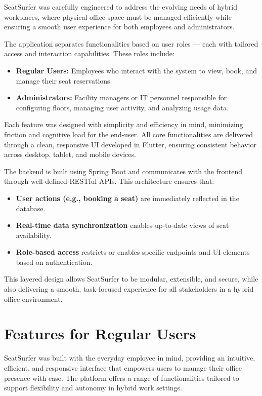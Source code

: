 \documentclass[12pt,a4paper]{report} %
\begin{document}
SeatSurfer was carefully engineered to address the evolving needs of hybrid workplaces, where physical office space must be managed efficiently while ensuring a smooth user experience for both employees and administrators.

The application separates functionalities based on user roles — each with tailored access and interaction capabilities. These roles include:

\begin{itemize}
    \item \textbf{Regular Users:} Employees who interact with the system to view, book, and manage their seat reservations.
    \item \textbf{Administrators:} Facility managers or IT personnel responsible for configuring floors, managing user activity, and analyzing usage data.
\end{itemize}

Each feature was designed with simplicity and efficiency in mind, minimizing friction and cognitive load for the end-user. All core functionalities are delivered through a clean, responsive UI developed in Flutter, ensuring consistent behavior across desktop, tablet, and mobile devices.

The backend is built using Spring Boot and communicates with the frontend through well-defined RESTful APIs. This architecture ensures that:

\begin{itemize}
    \item \textbf{User actions (e.g., booking a seat)} are immediately reflected in the database.
    \item \textbf{Real-time data synchronization} enables up-to-date views of seat availability.
    \item \textbf{Role-based access} restricts or enables specific endpoints and UI elements based on authentication.
\end{itemize}

This layered design allows SeatSurfer to be modular, extensible, and secure, while also delivering a smooth, task-focused experience for all stakeholders in a hybrid office environment.

\section{Features for Regular Users}

SeatSurfer was built with the everyday employee in mind, providing an intuitive, efficient, and responsive interface that empowers users to manage their office presence with ease. The platform offers a range of functionalities tailored to support flexibility and autonomy in hybrid work settings.
\end{document}
